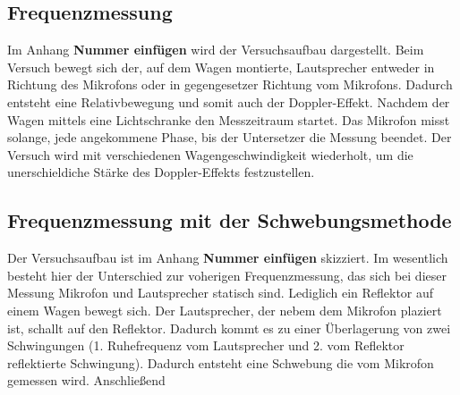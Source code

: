 \documentclass[parskip=half]{scrartcl} %
\begin{document}
\subsection{Frequenzmessung}

Im Anhang \textbf{Nummer einfügen} wird der Versuchsaufbau dargestellt.
Beim Versuch bewegt sich der, auf dem Wagen montierte, Lautsprecher entweder 
in Richtung des Mikrofons oder in gegengesetzer Richtung vom Mikrofons.
Dadurch entsteht eine Relativbewegung und somit auch der
Doppler-Effekt.
Nachdem der Wagen mittels eine Lichtschranke den Messzeitraum startet.
Das Mikrofon misst solange, jede angekommene Phase, bis der Untersetzer 
die Messung beendet.
Der Versuch wird mit verschiedenen Wagengeschwindigkeit
wiederholt, um die unerschieldiche Stärke des Doppler-Effekts 
festzustellen.

\subsection{Frequenzmessung mit der Schwebungsmethode}

Der Versuchsaufbau ist im Anhang \textbf{Nummer einfügen}
skizziert.
Im wesentlich besteht hier der Unterschied zur voherigen 
Frequenzmessung, das sich bei dieser Messung Mikrofon und
Lautsprecher statisch sind.
Lediglich ein Reflektor auf einem Wagen bewegt sich.
Der Lautsprecher, der nebem dem Mikrofon plaziert ist, schallt auf 
den Reflektor. Dadurch kommt es zu einer Überlagerung von zwei Schwingungen
(1. Ruhefrequenz vom Lautsprecher und 2. vom Reflektor reflektierte Schwingung).
Dadurch entsteht eine Schwebung die vom Mikrofon gemessen wird.
Anschließend 

\printbibliography
\printindex
\end{document}
